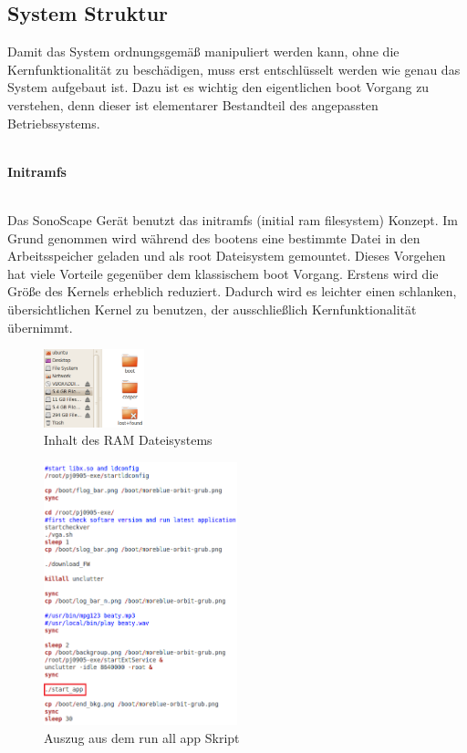 \subsection{System Struktur}
Damit das System ordnungsgemäß manipuliert werden kann, ohne die Kernfunktionalität zu beschädigen, muss erst entschlüsselt werden wie genau das System aufgebaut ist. Dazu ist es wichtig den eigentlichen boot Vorgang zu verstehen, denn dieser ist elementarer Bestandteil des angepassten Betriebssystems.\\\\
\begin{large}
\textbf{Initramfs}\\\\
\end{large}
Das SonoScape Gerät benutzt das initramfs (initial ram filesystem) Konzept. Im Grund genommen wird während des bootens eine bestimmte Datei in den Arbeitsspeicher geladen und als root Dateisystem gemountet. Dieses Vorgehen hat viele Vorteile gegenüber dem klassischem boot Vorgang. Erstens wird die Größe des Kernels erheblich reduziert. Dadurch wird es leichter einen schlanken, übersichtlichen Kernel zu benutzen, der ausschließlich Kernfunktionalität übernimmt. 
\begin{figure}
\centering
\includegraphics*[width =0.26\textwidth]{Sonoscape_Analyse/initramfs}
\caption{{\small Inhalt des RAM Dateisystems}}
\label{fig:RAM_Dateisystem}
\end{figure} 
\begin{figure}[h]
	\centering
	\includegraphics[width=0.5\textwidth]{Sonoscape_Analyse/run_all_app}
	\caption{Auszug aus dem run all app Skript}
	\label{fig:run_all_app}
\end{figure}
